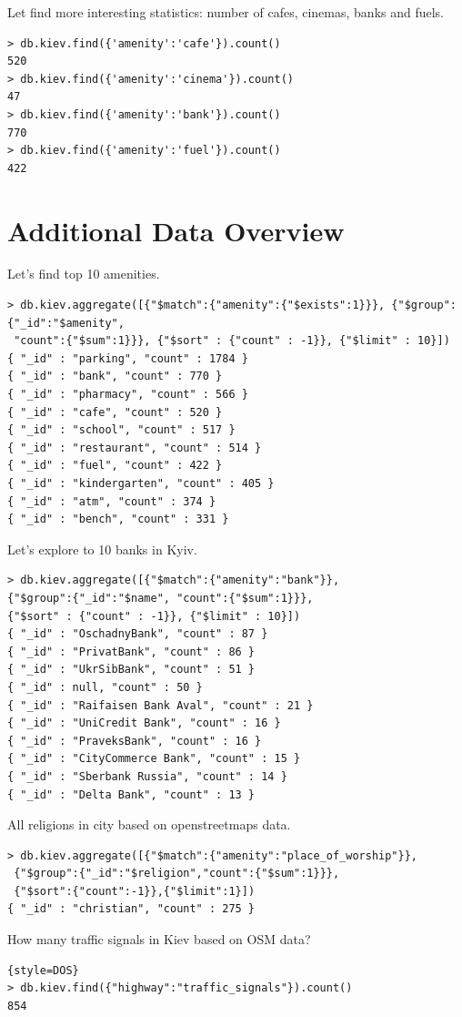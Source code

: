 \documentclass[a4paper,12pt]{article}
\begin{document}
Let find more interesting statistics: number of cafes, cinemas, banks and fuels.
\begin{lstlisting}[style=DOS]
> db.kiev.find({'amenity':'cafe'}).count()
520
> db.kiev.find({'amenity':'cinema'}).count()
47
> db.kiev.find({'amenity':'bank'}).count()
770
> db.kiev.find({'amenity':'fuel'}).count()
422
\end{lstlisting}
\section*{Additional Data Overview}
Let's find top 10 amenities.
\begin{lstlisting}[style=DOS]
> db.kiev.aggregate([{"$match":{"amenity":{"$exists":1}}}, {"$group":{"_id":"$amenity",
 "count":{"$sum":1}}}, {"$sort" : {"count" : -1}}, {"$limit" : 10}])
{ "_id" : "parking", "count" : 1784 }
{ "_id" : "bank", "count" : 770 }
{ "_id" : "pharmacy", "count" : 566 }
{ "_id" : "cafe", "count" : 520 }
{ "_id" : "school", "count" : 517 }
{ "_id" : "restaurant", "count" : 514 }
{ "_id" : "fuel", "count" : 422 }
{ "_id" : "kindergarten", "count" : 405 }
{ "_id" : "atm", "count" : 374 }
{ "_id" : "bench", "count" : 331 }
\end{lstlisting}
Let's explore to 10 banks in Kyiv.
\begin{lstlisting}[style=DOS]
> db.kiev.aggregate([{"$match":{"amenity":"bank"}}, 
{"$group":{"_id":"$name", "count":{"$sum":1}}}, 
{"$sort" : {"count" : -1}}, {"$limit" : 10}])
{ "_id" : "OschadnyBank", "count" : 87 }
{ "_id" : "PrivatBank", "count" : 86 }
{ "_id" : "UkrSibBank", "count" : 51 }
{ "_id" : null, "count" : 50 }
{ "_id" : "Raifaisen Bank Aval", "count" : 21 }
{ "_id" : "UniCredit Bank", "count" : 16 }
{ "_id" : "PraveksBank", "count" : 16 }
{ "_id" : "CityCommerce Bank", "count" : 15 }
{ "_id" : "Sberbank Russia", "count" : 14 }
{ "_id" : "Delta Bank", "count" : 13 }
\end{lstlisting}
All religions in city based on openstreetmaps data.
\begin{lstlisting}[style=DOS]
> db.kiev.aggregate([{"$match":{"amenity":"place_of_worship"}},
 {"$group":{"_id":"$religion","count":{"$sum":1}}}, 
 {"$sort":{"count":-1}},{"$limit":1}])
{ "_id" : "christian", "count" : 275 }
\end{lstlisting}
How many traffic signals in Kiev based on OSM data?
\begin{lstlisting}{style=DOS}
> db.kiev.find({"highway":"traffic_signals"}).count()
854
\end{lstlisting}
\end{document}
